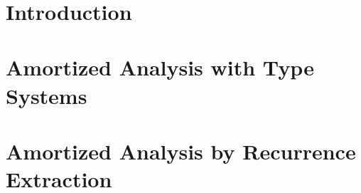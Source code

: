\documentclass[draft]{westhesis}
\title{ }
\author{ }
\begin{document}
\mainmatter

\chapter{Introduction}
%

\chapter{Amortized Analysis with Type Systems}
\label{chap:lambda-amor}



\chapter{Amortized Analysis by Recurrence Extraction}
\label{chap:rec-extr}




\end{document}
